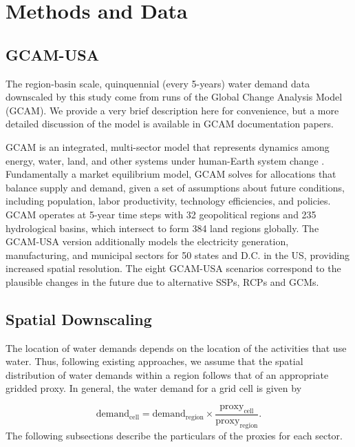 \documentclass[fleqn,10pt]{wlscirep}
\begin{document}
\section*{Methods and Data}

\subsection*{GCAM-USA}

The region-basin scale, quinquennial (every 5-years) water demand data downscaled by this study come from runs of the Global Change Analysis Model (GCAM)\cite{Zhao_gcamusa_water, Zhao2024}. We provide a very brief description here for convenience, but a more detailed discussion of the model is available in GCAM documentation papers\cite{Binsted_2022, RN1}.

GCAM is an integrated, multi-sector model that represents dynamics among energy, water, land, and other systems under human-Earth system change \cite{Binsted_2022, RN1}. Fundamentally a market equilibrium model, GCAM solves for allocations that balance supply and demand, given a set of assumptions about future conditions, including population, labor productivity, technology efficiencies, and policies. GCAM operates at 5-year time steps with 32 geopolitical regions and 235 hydrological basins, which intersect to form 384 land regions globally. The GCAM-USA version additionally models the electricity generation, manufacturing, and municipal sectors for 50 states and D.C. in the US, providing increased spatial resolution. The eight GCAM-USA scenarios correspond to the plausible changes in the future due to alternative SSPs, RCPs and GCMs. 


\subsection*{Spatial Downscaling}

The location of water demands depends on the location of the activities that use water. Thus, following existing approaches, we assume that the spatial distribution of water demands within a region follows that of an appropriate gridded proxy. In general, the water demand for a grid cell is given by

\begin{equation}
\text{demand}_\text{cell} = \text{demand}_\text{region} \times \frac{\text{proxy}_\text{cell}}{\text{proxy}_\text{region}}.
\end{equation}
The following subsections describe the particulars of the proxies for each sector.
\end{document}
